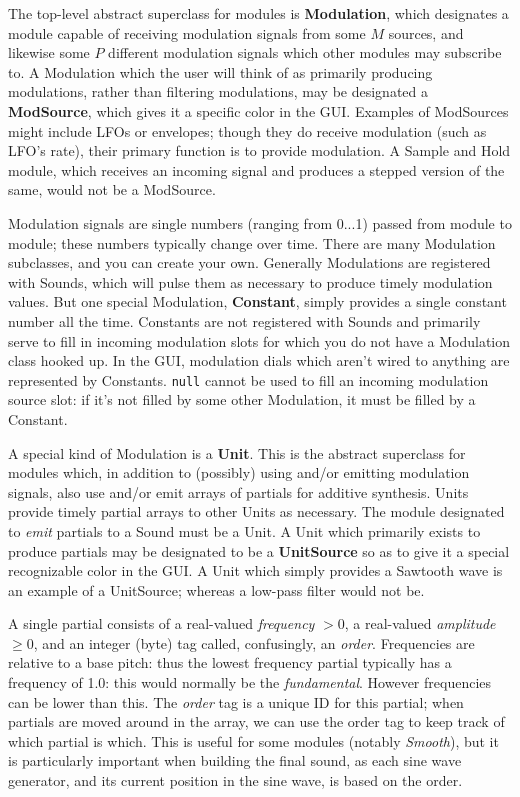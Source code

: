\documentclass{article}
\begin{document}
The top-level abstract superclass for modules is {\bf Modulation}, which designates a module capable of receiving modulation signals from some \(M\) sources, and likewise some \(P\) different modulation signals which other modules may subscribe to.  A Modulation which the user will think of as primarily producing modulations, rather than filtering modulations, may be designated a {\bf ModSource}, which gives it a specific color in the GUI. Examples of ModSources might include LFOs or envelopes; though they do receive modulation (such as LFO's rate), their primary function is to provide modulation.  A Sample and Hold module, which receives an incoming signal and produces a stepped version of the same, would not be a ModSource.
 
Modulation signals are single numbers (ranging from 0...1) passed from module to module; these numbers typically change over time.  There are many Modulation subclasses, and you can create your own.  Generally Modulations are registered with Sounds, which will pulse them as necessary to produce timely modulation values.  But one special Modulation, {\bf Constant}, simply provides a single constant number all the time.  Constants are not registered with Sounds and primarily serve to fill in incoming modulation slots for which you do not have a Modulation class hooked up.  In the GUI, modulation dials which aren't wired to anything are represented by Constants.  {\tt null} cannot be used to fill an incoming modulation source slot: if it's not filled by some other Modulation, it must be filled by a Constant.

A special kind of Modulation is a {\bf Unit}.  This is the abstract superclass for modules which, in addition to (possibly) using and/or emitting modulation signals, also use and/or emit arrays of partials for additive synthesis.  Units provide timely partial arrays to other Units as necessary.  The module designated to {\it emit} partials to a Sound must be a Unit.  A Unit which primarily exists to produce partials may be designated to be a {\bf UnitSource} so as to give it a special recognizable color in the GUI.  A Unit which simply provides a Sawtooth wave is an example of a UnitSource; whereas a low-pass filter would not be.

A single partial consists of a real-valued {\it frequency} \(> 0\), a real-valued {\it amplitude} \(\geq 0\), and an integer (byte) tag called, confusingly, an {\it order}.  Frequencies are relative to a base pitch: thus the lowest frequency partial typically has a frequency of 1.0: this would normally be the {\it fundamental}.   However frequencies can be lower than this.  The {\it order} tag is a unique ID for this partial; when partials are moved around in the array, we can use the order tag to keep track of which partial is which. This is useful for some modules (notably {\it Smooth}), but it is particularly important when building the final sound, as each sine wave generator, and its current position in the sine wave, is based on the order.
\end{document}
